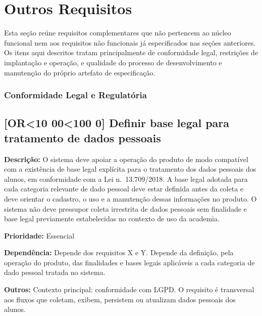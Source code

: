 
\newcommand{\orreqid}{OR\ifnum\value{orreq}<10 00\else\ifnum\value{orreq}<100 0\fi\fi\arabic{orreq}}

\newcommand{\reqoutro}[6]{%
  \refstepcounter{orreq}%
  \subsection{[\orreqid] #2}%
  \label{#1}%
  \noindent\textbf{Descrição:} #3

  \noindent\textbf{Prioridade:} #4

  \noindent\textbf{Dependência:} #5

  \noindent\textbf{Outros:} #6

  \vspace{0.4cm}
}

\section{Outros Requisitos}

Esta seção reúne requisitos complementares que não pertencem ao núcleo funcional nem aos requisitos não funcionais já especificados nas seções anteriores. Os itens aqui descritos tratam principalmente de conformidade legal, restrições de implantação e operação, e qualidade do processo de desenvolvimento e manutenção do próprio artefato de especificação.

\subsubsection*{Conformidade Legal e Regulatória}

\reqoutro
{or:base_legal_lgpd}
{Definir base legal para tratamento de dados pessoais}
{O sistema deve apoiar a operação do produto de modo compatível com a existência de base legal explícita para o tratamento dos dados pessoais dos alunos, em conformidade com a Lei n.\ 13.709/2018. A base legal adotada para cada categoria relevante de dado pessoal deve estar definida antes da coleta e deve orientar o cadastro, o uso e a manutenção dessas informações no produto. O sistema não deve pressupor coleta irrestrita de dados pessoais sem finalidade e base legal previamente estabelecidas no contexto de uso da academia.}
{Essencial}
{Depende dos requisitos X e Y. Depende da definição, pela operação do produto, das finalidades e bases legais aplicáveis a cada categoria de dado pessoal tratada no sistema.}
{Contexto principal: conformidade com LGPD. O requisito é transversal aos fluxos que coletam, exibem, persistem ou atualizam dados pessoais dos alunos.}

